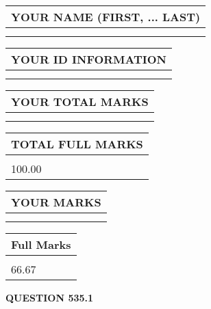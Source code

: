 \documentclass{ctexart}
\begin{document}
   
   
   
\newpage 
\setcounter{page}{ 
   535001 } 
   
   
   
   
\noindent\begin{tabular}{|l|}
\hline
YOUR NAME (FIRST, ... LAST)  \\
\hline
 \\ 
 \\ 
\hline
\end{tabular}
\hspace{0.05in} \begin{tabular}{|l|}
\hline
 YOUR   ID   INFORMATION  \\
\hline
 \\ 
 \\ 
\hline
\end{tabular}
   
   
\vspace{0.2in}\noindent\begin{tabular}{|l|}
\hline
YOUR TOTAL MARKS  \\
\hline
 \\ 
 \\ 
\hline
\end{tabular}
\hspace{0.05in} \begin{tabular}{|l|}
\hline
TOTAL FULL MARKS  \\
\hline
 \\ 
100.00 \\
\hline
\end{tabular}
   
   
 \vspace{0.2in}
 
 
 
 
   
   
  
\vspace{0.2in}
  
\noindent\begin{tabular}{|l|}
\hline
 YOUR MARKS  \\
\hline
 \\ 
 \\ 
\hline
\end{tabular}
\hspace{0.05in} \begin{tabular}{|l|}
\hline
 Full Marks  \\
\hline
 \\ 
66.67 \\
\hline
\end{tabular}
{\textbf{\Large{QUESTION
535.1 
}}}
  
\end{document}
